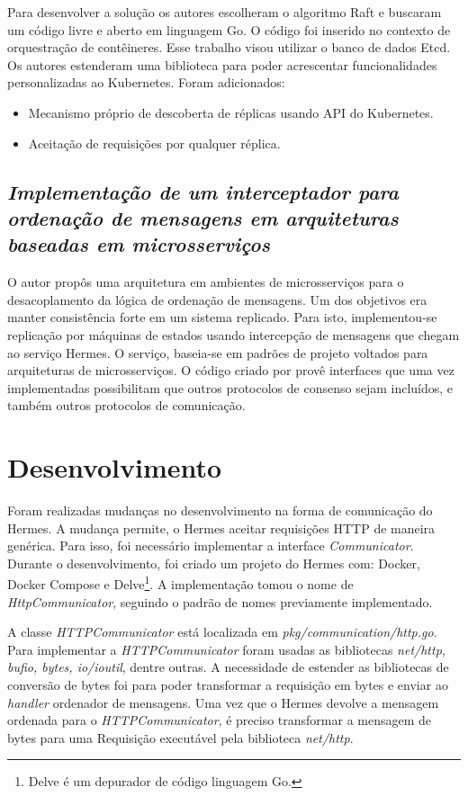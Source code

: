 \documentclass[12pt]{article}
\begin{document}
Para desenvolver a solução os autores escolheram o algoritmo Raft e buscaram um código livre e aberto em linguagem Go. O código foi inserido no contexto de orquestração de contêineres. Esse trabalho visou utilizar o banco de dados Etcd. Os autores estenderam uma biblioteca para poder acrescentar funcionalidades personalizadas ao Kubernetes. Foram adicionados:

\begin{itemize}
\item Mecanismo próprio de descoberta de réplicas usando API do Kubernetes.
\item Aceitação de requisições por qualquer réplica.
\end{itemize}

\subsection{\textit{Implementação de um interceptador para ordenação de mensagens em arquiteturas baseadas em microsserviços}}

O autor \cite{renan2021hermes} propôs uma arquitetura em ambientes de microsserviços para o desacoplamento da lógica de ordenação de mensagens. Um dos objetivos era manter consistência forte em um sistema replicado. Para isto, implementou-se replicação por máquinas de estados usando intercepção de mensagens que chegam ao serviço Hermes. O serviço, baseia-se em padrões de projeto voltados para arquiteturas de microsserviços. O código criado por \cite{renan2021hermes} provê interfaces que uma vez implementadas possibilitam que outros protocolos de consenso sejam incluídos, e também outros protocolos de comunicação.

\section{Desenvolvimento} \label{sec:des}

Foram realizadas mudanças no desenvolvimento na forma de comunicação do Hermes. A mudança permite, o Hermes aceitar requisições HTTP de maneira genérica. Para isso, foi necessário implementar a interface \textit{Communicator}. Durante o desenvolvimento, foi criado um projeto do Hermes com: Docker, Docker Compose e Delve\footnote{Delve é um depurador de código linguagem Go.}. A implementação tomou o nome de \textit{HttpCommunicator}, seguindo o padrão de nomes previamente implementado.

A classe \textit{HTTPCommunicator} está localizada em \textit{pkg/communication/http.go}. Para implementar a \textit{HTTPCommunicator} foram usadas as bibliotecas \textit{net/http, bufio, bytes, io/ioutil}, dentre outras. A necessidade de estender as bibliotecas de conversão de bytes foi para poder transformar a requisição em bytes e enviar ao \textit{handler} ordenador de mensagens. Uma vez que o Hermes devolve a mensagem ordenada para o \textit{HTTPCommunicator}, é preciso transformar a mensagem de bytes para uma Requisição executável pela biblioteca \textit{net/http}.
\end{document}
